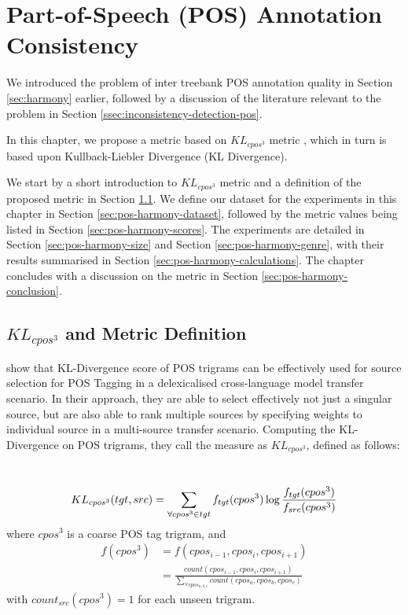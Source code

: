 \chapter{Part-of-Speech (POS) Annotation Consistency}
\label{chap:pos-harmony}

We introduced the problem of inter treebank POS annotation quality in Section \ref{sec:harmony} earlier, followed by a discussion of the literature relevant to the problem in Section \ref{ssec:inconsistency-detection-pos}. 

In this chapter, we propose a metric based on $KL_{cpos^3}$ metric \citep{klcpos3}, which in turn is based upon Kullback-Liebler Divergence (KL Divergence). 

We start by a short introduction to $KL_{cpos^3}$ metric and a definition of the proposed metric in Section \ref{sec:pos-harmony-definition}. We define our dataset for the experiments in this chapter in Section \ref{sec:pos-harmony-dataset}, followed by the metric values being listed in Section \ref{sec:pos-harmony-scores}. The experiments are detailed in Section \ref{sec:pos-harmony-size} and Section \ref{sec:pos-harmony-genre}, with their results summarised in Section \ref{sec:pos-harmony-calculations}. The chapter concludes with a discussion on the metric in Section \ref{sec:pos-harmony-conclusion}.

\section{\texorpdfstring{$KL_{cpos^3}$}{KLcpos3} and Metric Definition}
\label{sec:pos-harmony-definition}

\cite{klcpos3} show that KL-Divergence score of POS trigrams can be effectively used for source selection for POS Tagging in a delexicalised cross-language model transfer scenario. In their approach, they are able to select effectively not just a singular source, but are also able to rank multiple sources by specifying weights to individual source in a multi-source transfer scenario. Computing the KL-Divergence on POS trigrams, they call the measure as $KL_{cpos^3}$, defined as follows:

\begin{definition}
\label{def:klcpos3}
\textbf{ }\\
\begin{equation}
\label{eqn:klcpos3}
\small KL_{cpos^3}(tgt, src) = \sum_{\forall cpos^3 \in tgt}^{}f_{tgt}(cpos^3)\log\frac{f_{tgt}(cpos^3)}{f_{src}(cpos^3)}
\end{equation}
where $cpos^3$ is a coarse POS tag trigram, and \\
\begin{align}
\label{eqn:cpos}
f(cpos^3) & = \nonumber f(cpos_{i-1}, cpos_{i}, cpos_{i+1}) \\ &= \frac{count(cpos_{i-1}, cpos_{i}, cpos_{i+1})}{\sum_{\forall cpos_{a,b,c}}{count(cpos_{a}, cpos_{b}, cpos_{c})}}
\end{align}
with $count_{src}(cpos^3) = 1$ for each unseen trigram.
\end{definition}

